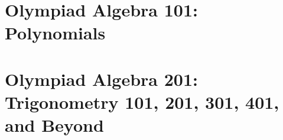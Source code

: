 \documentclass[12pt,a4paper]{memoir}
\theoremstyle{definition}
\begin{document}
\chapter{Olympiad Algebra 101:\\ Polynomials}\label{ch:POLY}
\newpage

\newpage

\newpage

\newpage

\newpage

\newpage

\newpage

\newpage

\newpage

\chapter{Olympiad Algebra 201:\\ Trigonometry 101, 201, 301, 401, and Beyond}
\newpage









\end{document}
